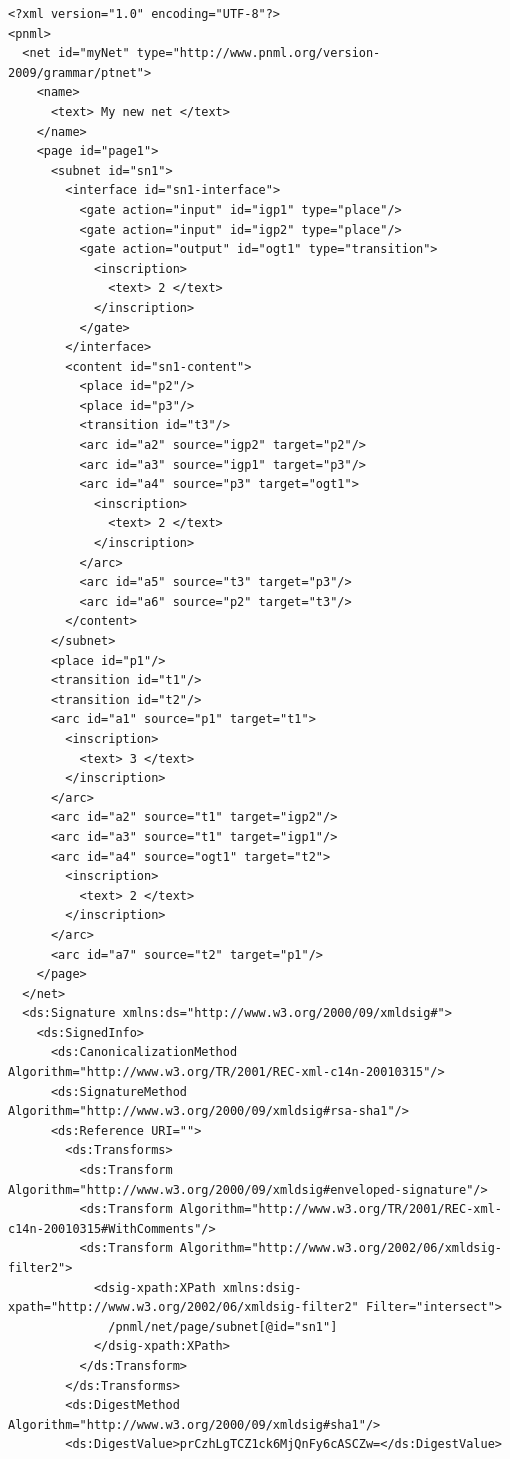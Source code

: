 \begin{lstlisting}[basicstyle=\ttfamily\tiny]
<?xml version="1.0" encoding="UTF-8"?>
<pnml>
  <net id="myNet" type="http://www.pnml.org/version-2009/grammar/ptnet">
    <name>
      <text> My new net </text>
    </name>
    <page id="page1">
      <subnet id="sn1">
        <interface id="sn1-interface">
          <gate action="input" id="igp1" type="place"/>
          <gate action="input" id="igp2" type="place"/>
          <gate action="output" id="ogt1" type="transition">
            <inscription>
              <text> 2 </text>
            </inscription>
          </gate>
        </interface>
        <content id="sn1-content">
          <place id="p2"/>
          <place id="p3"/>
          <transition id="t3"/>
          <arc id="a2" source="igp2" target="p2"/>
          <arc id="a3" source="igp1" target="p3"/>
          <arc id="a4" source="p3" target="ogt1">
            <inscription>
              <text> 2 </text>
            </inscription>
          </arc>
          <arc id="a5" source="t3" target="p3"/>
          <arc id="a6" source="p2" target="t3"/>
        </content>
      </subnet>
      <place id="p1"/>
      <transition id="t1"/>
      <transition id="t2"/>
      <arc id="a1" source="p1" target="t1">
        <inscription>
          <text> 3 </text>
        </inscription>
      </arc>
      <arc id="a2" source="t1" target="igp2"/>
      <arc id="a3" source="t1" target="igp1"/>
      <arc id="a4" source="ogt1" target="t2">
        <inscription>
          <text> 2 </text>
        </inscription>
      </arc>
      <arc id="a7" source="t2" target="p1"/>
    </page>
  </net>
  <ds:Signature xmlns:ds="http://www.w3.org/2000/09/xmldsig#">
    <ds:SignedInfo>
      <ds:CanonicalizationMethod Algorithm="http://www.w3.org/TR/2001/REC-xml-c14n-20010315"/>
      <ds:SignatureMethod Algorithm="http://www.w3.org/2000/09/xmldsig#rsa-sha1"/>
      <ds:Reference URI="">
        <ds:Transforms>
          <ds:Transform Algorithm="http://www.w3.org/2000/09/xmldsig#enveloped-signature"/>
          <ds:Transform Algorithm="http://www.w3.org/TR/2001/REC-xml-c14n-20010315#WithComments"/>
          <ds:Transform Algorithm="http://www.w3.org/2002/06/xmldsig-filter2">
            <dsig-xpath:XPath xmlns:dsig-xpath="http://www.w3.org/2002/06/xmldsig-filter2" Filter="intersect">
              /pnml/net/page/subnet[@id="sn1"]
            </dsig-xpath:XPath>
          </ds:Transform>
        </ds:Transforms>
        <ds:DigestMethod Algorithm="http://www.w3.org/2000/09/xmldsig#sha1"/>
        <ds:DigestValue>prCzhLgTCZ1ck6MjQnFy6cASCZw=</ds:DigestValue>

\end{lstlisting}
